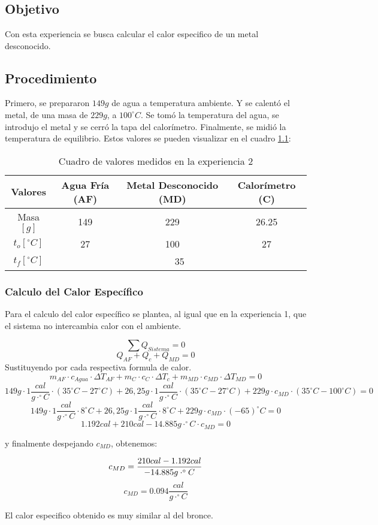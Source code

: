 \documentclass[12pt]{report}
\begin{document}
\chapter{}
\section{Objetivo}
Con esta experiencia se busca calcular el calor especifico de un metal desconocido.

\section{Procedimiento}
Primero, se prepararon $149 g$ de agua a temperatura ambiente. Y se calentó el metal, de una masa de $229 g$, a $100^\circ C$. Se tomó la temperatura del agua, se introdujo el metal y se cerró la tapa del calorímetro. Finalmente, se midió la temperatura de equilibrio.
Estos valores se pueden visualizar en el cuadro \ref{table:data}:

\begin{table}[htpb!]
\centering
\begin{tabular}{|c|c|c|c|}
    \hline
    Valores & Agua Fría (AF) & Metal Desconocido (MD)  & Calorímetro (C)\\
    \hline
    Masa$[g]$ & 149 & 229 & 26.25 \\
    \hline
    $t_o [^\circ C]$ & 27 & 100 & 27 \\
    \hline
    $t_f [^\circ C]$ & \multicolumn{3}{|c|}{35}\\
    \hline
\end{tabular}
\caption{Cuadro de valores medidos en la experiencia 2}
\label{table:data}
\end{table}

\subsection{Calculo del Calor Específico}

Para el calculo del calor específico se plantea, al igual que en la experiencia 1, que el sistema no intercambia calor con el ambiente.

$$\sum Q_{Sistema} = 0$$
$$Q_{AF} + Q_c + Q_{MD} = 0$$
\hspace{1cm} Sustituyendo por cada respectiva formula de calor.
$$m_{AF} \cdot c_{Agua} \cdot {\Delta T}_{AF} + m_C \cdot c_C \cdot {\Delta T}_c + m_{MD} \cdot c_{MD} \cdot {\Delta T}_{MD} = 0$$
$$149g \cdot 1 \frac{cal}{g\cdot^\circ C} \cdot (35^\circ C - 27^\circ C) + 26,25g \cdot 1 \frac{cal}{g\cdot^\circ C} \cdot (35^\circ C - 27^\circ C) + 229g \cdot  c_{MD} \cdot (35^\circ C - 100^\circ C) = 0$$
$$149g \cdot 1 \frac{cal}{g\cdot^\circ C} \cdot 8^\circ C + 26,25g \cdot 1 \frac{cal}{g\cdot^\circ C} \cdot 8^\circ C + 229g \cdot c_{MD}  \cdot (-65)^\circ C = 0$$
$$1.192 cal + 210 cal - 14.885 g\cdot^\circ C \cdot c_{MD}  = 0$$

\hspace{1cm} y finalmente despejando $c_{MD}$, obtenemos:

$$c_{MD}  = \frac{210 cal - 1.192 cal}{-14.885 g\cdot^\circ C}\\$$
$$c_{MD}  = 0.094 \frac{cal}{g\cdot^\circ C}$$

El calor especifico obtenido es muy similar al del bronce.
\end{document}
